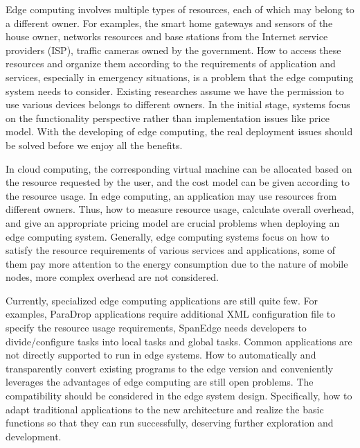Edge computing involves multiple types of resources, each of which may belong to a different owner. For examples, the smart home gateways and sensors of the house owner, networks resources and base stations from the Internet service providers (ISP), traffic cameras owned by the government. How to access these resources and organize them according to the requirements of application and services, especially in emergency situations, is a problem that the edge computing system needs to consider. Existing researches assume we have the permission to use various devices belongs to different owners. In the initial stage, systems focus on the functionality perspective rather than implementation issues like price model. With the developing of edge computing, the real deployment issues should be solved before we enjoy all the benefits.

In cloud computing, the corresponding virtual machine can be allocated based on the resource requested by the user, and the cost model can be given according to the resource usage. In edge computing, an application may use resources from different owners. Thus, how to measure resource usage, calculate overall overhead, and give an appropriate pricing model are crucial problems when deploying an edge computing system. Generally, edge computing systems focus on how to satisfy the resource requirements of various services and applications, some of them pay more attention to the energy consumption due to the nature of mobile nodes, more complex overhead are not considered.

Currently, specialized edge computing applications are still quite few. For examples, ParaDrop applications require additional XML configuration file to specify the resource usage requirements, SpanEdge needs developers to divide/configure tasks into local tasks and global tasks. Common applications are not directly supported to run in edge systems. How to automatically and transparently convert existing programs to the edge version and conveniently leverages the advantages of edge computing are still open problems. The compatibility should be considered in the edge system design. Specifically, how to adapt traditional applications to the new architecture and realize the basic functions so that they can run successfully, deserving further exploration and development.

